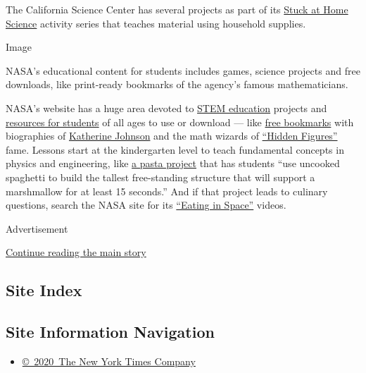 The California Science Center has several projects as part of its
\href{https://californiasciencecenter.org/stuck-at-home-science}{Stuck
at Home Science} activity series that teaches material using household
supplies.

Image

NASA's educational content for students includes games, science projects
and free downloads, like print-ready bookmarks of the agency's famous
mathematicians.

NASA's website has a huge area devoted to
\href{https://www.nasa.gov/stem}{STEM education} projects and
\href{https://www.nasa.gov/education/materials/}{resources for students}
of all ages to use or download --- like
\href{https://www.nasa.gov/stem-ed-resources/from-hidden-figures-to-modern-figures-bookmark-and-minibiography.html}{free
bookmarks} with biographies of
\href{https://www.nasa.gov/content/katherine-johnson-biography}{Katherine
Johnson} and the math wizards of
\href{https://family.20thcenturystudios.com/movies/hidden-figures}{``Hidden
Figures''} fame. Lessons start at the kindergarten level to teach
fundamental concepts in physics and engineering, like
\href{https://www.nasa.gov/stem-ed-resources/building-with-pasta.html}{a
pasta project} that has students ``use uncooked spaghetti to build the
tallest free-standing structure that will support a marshmallow for at
least 15 seconds.'' And if that project leads to culinary questions,
search the NASA site for its
\href{https://www.nasa.gov/audience/foreducators/stem-on-station/ditl_eating}{``Eating
in Space''} videos.

Advertisement

\protect\hyperlink{after-bottom}{Continue reading the main story}

\hypertarget{site-index}{%
\subsection{Site Index}\label{site-index}}

\hypertarget{site-information-navigation}{%
\subsection{Site Information
Navigation}\label{site-information-navigation}}

\begin{itemize}
\tightlist
\item
  \href{https://help.nytimes3xbfgragh.onion/hc/en-us/articles/115014792127-Copyright-notice}{©~2020~The
  New York Times Company}
\end{itemize}

